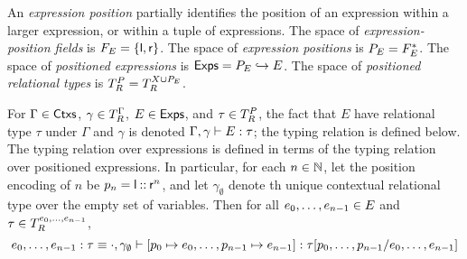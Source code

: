 An \emph{expression position} partially identifies the position of an
expression within a larger expression, or within a tuple of
expressions.
%
The space of \emph{expression-position fields} is
$\expposfields = \elts{ \leftchild, \rightchild }$.
%
The space of \emph{expression positions} is
$\exppos = \expposfields^{*}$.
%
The space of \emph{positioned expressions} is
$\posexps = \exppos \partto \expr$.
% 
The space of \emph{positioned relational types} is
$\posreltypes = \reltypes{\vars \union \exppos}$.

For $\Gamma \in \ctxs$, $\gamma \in \ctxreltypes$, $E \in \posexps$,
and $\tau \in \posreltypes$, the fact that $E$ have relational type
$\tau$ under $\Gamma$ and $\gamma$ is denoted
$\Gamma, \gamma \judges E : \tau$;
%
the typing relation is defined below.
%
The typing relation over expressions is defined in terms of the typing
relation over positioned expressions.
%
In particular, for each $n \in \nats$, let the position encoding of
$n$ be $\pos{n} = \leftchild \cons \rightchild^{n}$, and let
$\gamma_{\emptyset}$ denote th unique contextual relational type over
the empty set of variables.
%
Then for all $e_0, \ldots, e_{n - 1} \in \expr$ and
$\tau \in \reltypes{ e_0, \ldots, e_{n - 1} }$,
\[ e_0, \ldots, e_{n - 1} : \tau \equiv \cdot, \gamma_{\emptyset}
  \judges [ \pos{0} \mapsto e_0, \ldots, \pos{n - 1} \mapsto e_{n - 1}
  ] : \replace{ \tau }{ e_0, \ldots, e_{n - 1} }{ \pos{0}, \ldots,
    \pos{n - 1} } \]

